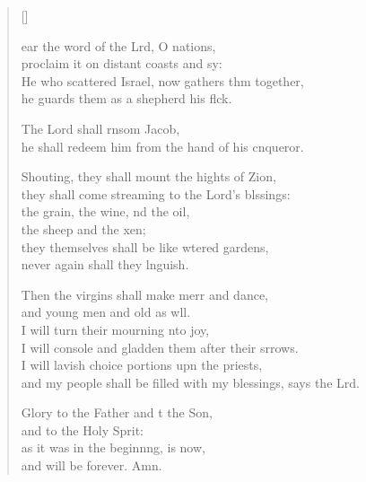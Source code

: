\settowidth{\versewidth}{and my people shall be filled with my blessings, says the Lord.}
\begin{verse}[\versewidth]
  \begin{patverse}
    ear the word of the Lrd, O nations,\Med\\
proclaim it on distant coasts and sy:\\
He who scattered Israel, now gathers thm together,\Med\\
he guards them as a shepherd his flck.

The Lord shall rnsom Jacob,\Med\\
he shall redeem him from the hand of his cnqueror.

Shouting, they shall mount the hights of Zion,\Med\\
they shall come streaming to the Lord’s blssings:\\
the grain, the wine, nd the oil,\Med\\
the sheep and the xen;\\
they themselves shall be like wtered gardens,\Med\\
never again shall they lnguish.

Then the virgins shall make merr and dance,\Med\\
and young men and old as wll.\\
I will turn their mourning \pointup{\i}nto joy,\Med\\
I will console and gladden them after their srrows.\\
I will lavish choice portions upn the priests,\Med\\
and my people shall be filled with my blessings, says the Lrd.

Glory to the Father and t the Son,\Med\\
and to the Holy Sp\pointup{\i}rit:\\
as it was in the beginn\pointup{\i}ng, is now,\Med\\
and will be forever. Amn. 
  \end{patverse}
\end{verse}
